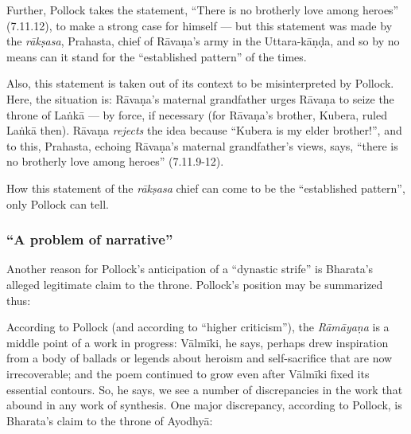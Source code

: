 Further, Pollock takes the statement, “There is no brotherly love among heroes” (7.11.12), to make a strong case for himself --- but this statement was made by the {\sl rākṣasa}, Prahasta, chief of Rāvaṇa’s army in the Uttara-kāṇḍa, and so by no means can it stand for the “established pattern” of the times. 

Also, this statement is taken out of its context to be misinterpreted by Pollock. Here, the situation is: Rāvaṇa’s maternal grandfather urges Rāvaṇa to seize the throne of Laṅkā --- by force, if necessary (for Rāvaṇa’s brother, Kubera, ruled Laṅkā then). Rāvaṇa {\sl rejects} the idea because “Kubera is my elder brother!”, and to this, Prahasta, echoing Rāvaṇa’s maternal grandfather’s views, says, “there is no brotherly love among heroes” (7.11.9-12).

How this statement of the {\sl rākṣasa} chief can come to be the “established pattern”, only Pollock can tell.\\[-21pt] 

\subsubsection{“A problem of narrative”}\label{sec1.2.3.2}

Another reason for Pollock’s anticipation of a “dynastic strife” is Bharata’s alleged legitimate claim to the throne. Pollock’s position may be summarized thus: 

According to Pollock (and according to “higher criticism”), the {\sl Rāmāyaṇa} is a middle point of a work in progress: Vālmīki, he says, perhaps drew inspiration from a body of ballads or legends about heroism and self-sacrifice that are now irrecoverable; and the poem continued to grow even after Vālmīki fixed its essential contours. So, he says, we see a number of discrepancies in the work that abound in any work of synthesis. One major discrepancy, according to Pollock, is Bharata’s claim to the throne of Ayodhyā: 

